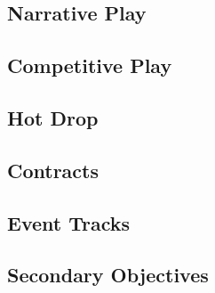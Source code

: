 

\subsection{Narrative Play}



\subsection{Competitive Play}



\newpage

\subsection{Hot Drop}



\newpage

\subsection{Contracts}



\subsection{Event Tracks}



\subsection{Secondary Objectives}


